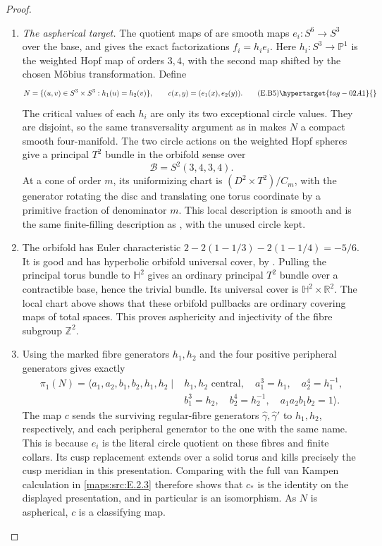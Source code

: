 \begin{proof}
\begin{enumerate}[label={$\langle1\rangle$\arabic*.},leftmargin=*]
\item \emph{The aspherical target.}
The quotient maps of  are smooth maps
$e_i:S^6\to S^3$ over the base, and  gives the exact
factorizations $f_i=h_i e_i$. Here $h_i:S^3\to\mathbb P^1$
is the weighted Hopf map of orders $3,4$, with the second
map shifted by the chosen M\"obius transformation. Define
\[
 N=\{(u,v)\in S^3\times S^3:h_1(u)=h_2(v)\},\qquad
 c(x,y)=(e_1(x),e_2(y)).
 \tag{E.B5}\hypertarget{tag-02A1}{}\label{maps:eq:E.B5}
\]
The critical values of each $h_i$ are only its two exceptional
circle values. They are disjoint, so the same transversality
argument as in  makes $N$ a compact smooth four-manifold.
The two circle actions on the weighted Hopf spheres give a
principal $T^2$ bundle in the orbifold sense over
\[
                  \mathcal B=S^2(3,4,3,4).
\]
At a cone of order $m$, its uniformizing chart is
$(D^2\times T^2)/C_m$, with the generator rotating the disc
and translating one torus coordinate by a primitive fraction
of denominator $m$. This local description is smooth and is
the same finite-filling description as , with the unused circle kept.

\item The orbifold has Euler characteristic
$2-2(1-1/3)-2(1-1/4)=-5/6$. It is good and has hyperbolic
orbifold universal cover, by
\cite[Theorems 2.3--2.4 and the Euler-number discussion in
Section 2]{rootScott83}. Pulling the principal torus bundle to
$\mathbb H^2$ gives an ordinary principal $T^2$ bundle over a
contractible base, hence the trivial bundle. Its universal
cover is $\mathbb H^2\times\mathbb R^2$. The local chart above
shows that these orbifold pullbacks are ordinary covering maps
of total spaces. This proves asphericity and injectivity of
the fibre subgroup $\mathbb Z^2$.

\item Using the marked fibre generators $h_1,h_2$ and the four
positive peripheral generators gives exactly
\[
 \begin{split}
 \pi_1(N)=\langle a_1,a_2,b_1,b_2,h_1,h_2\mid {}&h_1,h_2
       \text{ central},\quad a_1^3=h_1,\quad a_2^4=h_1^{-1},\\
 &b_1^3=h_2,\quad b_2^4=h_2^{-1},\quad
 a_1a_2b_1b_2=1\rangle.
 \end{split}
\]
The map $c$ sends the surviving regular-fibre generators
$\widehat\gamma,\widehat\gamma'$ to $h_1,h_2$, respectively,
and each peripheral generator to the one with the same name.
This is because $e_i$ is the literal circle quotient on these
fibres and finite collars. Its cusp replacement extends over
a solid torus and kills precisely the cusp meridian in this
presentation. Comparing with the full van Kampen calculation
in \ref{maps:src:E.2.3} therefore shows that $c_*$ is the identity on the
displayed presentation, and in particular is an isomorphism.
As $N$ is aspherical, $c$ is a classifying map.


\end{enumerate}
\end{proof}

